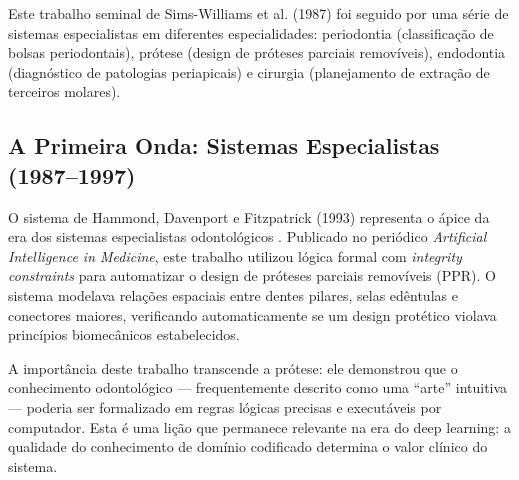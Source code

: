 
Este trabalho seminal de Sims-Williams et al. (1987) \cite{ODT-052} foi seguido por uma série de sistemas especialistas em diferentes especialidades: periodontia (classificação de bolsas periodontais), prótese (design de próteses parciais removíveis), endodontia (diagnóstico de patologias periapicais) e cirurgia (planejamento de extração de terceiros molares).

\subsection{A Primeira Onda: Sistemas Especialistas (1987--1997)}

O sistema de Hammond, Davenport e Fitzpatrick (1993) representa o ápice da era dos sistemas especialistas odontológicos \cite{ODT-003}. Publicado no periódico \textit{Artificial Intelligence in Medicine}, este trabalho utilizou lógica formal com \textit{integrity constraints} para automatizar o design de próteses parciais removíveis (PPR). O sistema modelava relações espaciais entre dentes pilares, selas edêntulas e conectores maiores, verificando automaticamente se um design protético violava princípios biomecânicos estabelecidos.


A importância deste trabalho transcende a prótese: ele demonstrou que o conhecimento odontológico — frequentemente descrito como uma ``arte'' intuitiva — poderia ser formalizado em regras lógicas precisas e executáveis por computador. Esta é uma lição que permanece relevante na era do deep learning: a qualidade do conhecimento de domínio codificado determina o valor clínico do sistema.


